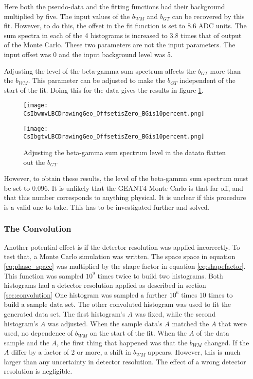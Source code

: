 \documentclass[../MaxHughesThesis.tex]{subfiles}
\begin{document}
Here both the pseudo-data and the fitting functions had their background multiplied by five. 
The input values of the $b_{WM}$ and $b_{GT}$ can be recovered by this fit.
However, to do this, the offset in the fit function is set to 8.6 ADC units.
The sum spectra in each of the 4 histograms is increased to 3.8 times that of output of the Monte Carlo.
These two parameters are not the input parameters.
The input offset was 0 and the input background level was 5.

Adjusting the level of the beta-gamma sum spectrum affects the $b_{GT}$ more than the $b_{WM}$.
This parameter can be adjusted to make the $b_{GT}$ independent of the start of the fit.
Doing this for the data gives the results in figure \ref{fig:dataoffset0BG10per}. 

\begin{figure}
    \centering
    \begin{minipage}{0.50\textwidth}
        \centerline{\texttt{[image: CsIbwmvLBCDrawingGeo\_OffsetisZero\_BGis10percent.png]}}
    \end{minipage}\hfill
    \begin{minipage}{0.50\textwidth}
        \centerline{\texttt{[image: CsIbgtvLBCDrawingGeo\_OffsetisZero\_BGis10percent.png]}}
    \end{minipage}
    \caption{Adjusting the beta-gamma sum spectrum level in the datato flatten out the $b_{GT}$}
    \label{fig:dataoffset0BG10per}
\end{figure}

However, to obtain these results, the level of the beta-gamma sum spectrum must be set to 0.096. 
It is unlikely that the GEANT4 Monte Carlo is that far off, and that this number corresponds to anything physical.
It is unclear if this procedure is a valid one to take.
This has to be investigated further and solved.

\subsubsection{The Convolution}

Another potential effect is if the detector resolution was applied incorrectly.
To test that, a Monte Carlo simulation was written.
The space space in equation \ref{eq:phase_space} was multiplied by the shape factor in equation \ref{eq:shapefactor}.
This function was sampled $10^{9}$ times twice to build two histograms. 
Both histograms had a detector resolution applied as described in section \ref{sec:convolution}
One histogram was sampled a further $10^{6}$ times 10 times to build a sample data set.
The other convoluted histogram was used to fit the generated data set.
The first histogram's $A$ was fixed, while the second histogram's $A$ was adjusted.
When the sample data's $A$ matched the $A$ that were used, no dependence of $b_{WM}$ on the start of the fit.
When the $A$ of the data sample and the $A$, the first thing that happened was that the $b_{WM}$ changed.
If the $A$ differ by a factor of 2 or more, a shift in $b_{WM}$ appears.
However, this is much larger than any uncertainty in detector resolution.
The effect of a wrong detector resolution is negligible. 
\end{document}
